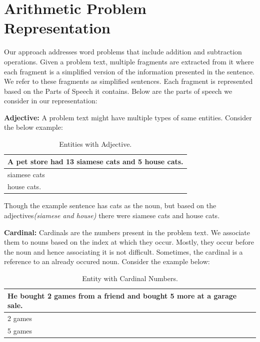 \documentclass[11pt]{article}
\begin{document}
\section{Arithmetic Problem Representation}

Our approach addresses word problems that include addition and subtraction operations. Given a problem text, multiple fragments are extracted from it  where each fragment is a simplified version of the information presented in the sentence. We refer to these fragments as simplified sentences. Each fragment is represented based on the Parts of Speech it contains. Below are the parts of speech we consider in our representation:


\textbf{Adjective:} A problem text might have multiple types of same entities. Consider the below example:

 \begin{table}[h!]
\centering
\begin{tabular}{ | m{25em} | }
\hline
 \textbf{A pet store had 13 siamese cats and 5 house cats.}\\
\hline
 siamese cats\\
\hline
house cats.\\
\hline
\end{tabular}
\caption{Entities with Adjective.}
\label{table:2}
\end{table}

Though the example sentence has cats as the noun, but based on the adjectives\textit{(siamese and house)} there were siamese cats and house cats.
\vspace{4mm}

\textbf{Cardinal:} Cardinals are the numbers present in the problem text. We associate them to nouns based on the index at which they occur. Mostly, they occur before the noun and hence associating it is not difficult. Sometimes, the cardinal is a reference to an already occured noun. Consider the example below:

\begin{table}[h!]
\centering
\begin{tabular}{ | m{25em} | }
\hline
\textbf{He bought 2 games from a friend and bought 5 more at a garage sale.}\\
\hline
2 games\\
\hline
5 games\\
\hline
\end{tabular}
\caption{Entity with Cardinal Numbers.}
\label{table:3}
\end{table}
\end{document}
